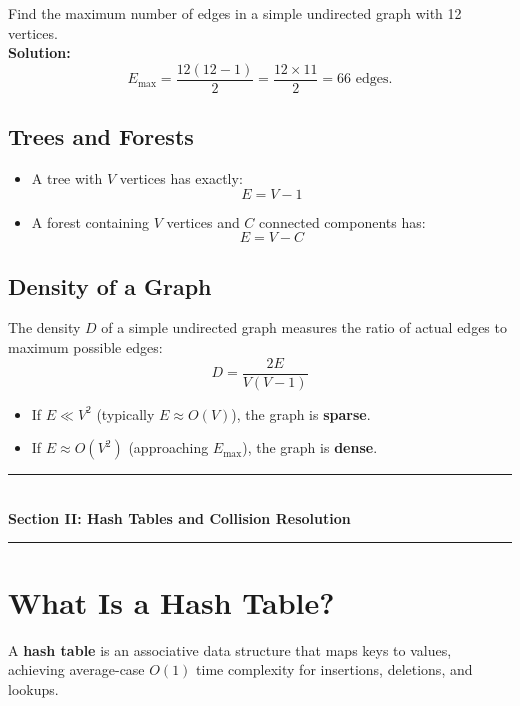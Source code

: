 \begin{tcolorbox}[title=\textbf{Worked Example: Maximum Edges}]
Find the maximum number of edges in a simple undirected graph with 12 vertices.\\
\textbf{Solution:}
\[
E_{\max} = \frac{12(12-1)}{2} = \frac{12 \times 11}{2} = 66 \text{ edges.}
\]
\end{tcolorbox}

\subsection{Trees and Forests}
\begin{itemize}
    \item A tree with $V$ vertices has exactly:
    \[
    \boxed{E = V - 1}
    \]
    \item A forest containing $V$ vertices and $C$ connected components has:
    \[
    \boxed{E = V - C}
    \]
\end{itemize}

\subsection{Density of a Graph}
The density $D$ of a simple undirected graph measures the ratio of actual edges to maximum possible edges:
\[
D = \frac{2E}{V(V-1)}
\]
\begin{itemize}
    \item If $E \ll V^2$ (typically $E \approx O(V)$), the graph is \textbf{sparse}.
    \item If $E \approx O(V^2)$ (approaching $E_{\max}$), the graph is \textbf{dense}.
\end{itemize}

\newpage
\begin{center}
\vspace{0.5em}
{\color{primary}\rule{0.45\textwidth}{1.2pt}}\\[4pt]
{\Large\bfseries\color{primary} Section II: Hash Tables and Collision Resolution}\\[2pt]
{\color{primary}\rule{0.45\textwidth}{1.2pt}}
\vspace{0.5em}
\end{center}

\section{What Is a Hash Table?}

A \textbf{hash table} is an associative data structure that maps keys to values, achieving average-case $O(1)$ time complexity for insertions, deletions, and lookups.

